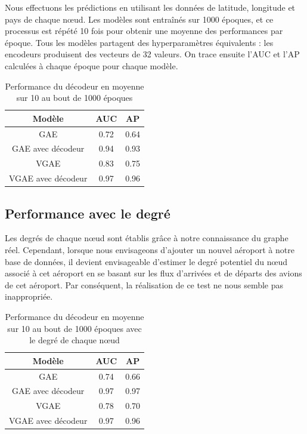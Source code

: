 \documentclass{article}
\begin{document}
Nous effectuons les prédictions en utilisant les données de latitude, longitude et pays de chaque nœud. Les modèles sont entraînés sur 1000 époques, et ce processus est répété 10 fois pour obtenir une moyenne des performances par époque. Tous les modèles partagent des hyperparamètres équivalents : les encodeurs produisent des vecteurs de 32 valeurs. On trace ensuite l'AUC et l'AP calculées à chaque époque pour chaque modèle.

\begin{table}[H]
    \centering
    \begin{tabular}{|c|c|c|}
        \hline
        Modèle & AUC & AP\\
        \hline
        GAE & 0.72 & 0.64\\
        \hline
        GAE avec décodeur & 0.94 & 0.93\\
        \hline
        VGAE & 0.83 & 0.75\\
        \hline
        VGAE avec décodeur & 0.97 & 0.96\\
        \hline
    \end{tabular}
    \caption{Performance du décodeur en moyenne sur 10 au bout de 1000 époques}
    \label{tab:performance_decodeur}
\end{table}

\subsection{Performance avec le degré}

Les degrés de chaque nœud sont établis grâce à notre connaissance du graphe réel. Cependant, lorsque nous envisageons d'ajouter un nouvel aéroport à notre base de données, il devient envisageable d'estimer le degré potentiel du nœud associé à cet aéroport en se basant sur les flux d'arrivées et de départs des avions de cet aéroport. Par conséquent, la réalisation de ce test ne nous semble pas inappropriée.

\begin{table}[H]
    \centering
    \begin{tabular}{|c|c|c|}
        \hline
        Modèle & AUC & AP\\
        \hline
        GAE & 0.74 & 0.66\\
        \hline
        GAE avec décodeur & 0.97 & 0.97\\
        \hline
        VGAE & 0.78 & 0.70\\
        \hline
        VGAE avec décodeur & 0.97 & 0.96\\
        \hline
    \end{tabular}
    \caption{Performance du décodeur en moyenne sur 10 au bout de 1000 époques avec le degré de chaque nœud}
    \label{tab:performance_decodeur_avec_degre}
\end{table}
\end{document}

